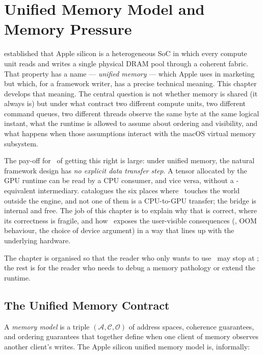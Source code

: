 \chapter{Unified Memory Model and Memory Pressure}
\label{ch:unified_memory}

 established that Apple silicon is a
heterogeneous SoC in which every compute unit reads and writes a
single physical DRAM pool through a coherent fabric. That property has
a name --- \emph{unified memory} --- which Apple uses in marketing but
which, for a framework writer, has a precise technical meaning. This
chapter develops that meaning. The central question is not whether
memory is shared (it always is) but under what contract two different
compute units, two different command queues, two different threads
observe the same byte at the same logical instant, what the runtime is
allowed to assume about ordering and visibility, and what happens when
those assumptions interact with the macOS virtual memory subsystem.

The pay-off for \Lucid\ of getting this right is large: under unified
memory, the natural framework design has \emph{no explicit data
transfer step}. A tensor allocated by the GPU runtime can be read by
a CPU consumer, and vice versa, without a -equivalent
intermediary.  catalogues the six places
where \Lucid\ touches the world outside the engine, and not one of
them is a CPU-to-GPU transfer; the bridge is internal and free. The
job of this chapter is to explain why that is correct, where its
correctness is fragile, and how \Lucid\ exposes the user-visible
consequences (, OOM behaviour, the choice of
device argument) in a way that lines up with the underlying
hardware.

The chapter is organised so that the reader who only wants to use
\Lucid\ may stop at ; the rest is for
the reader who needs to debug a memory pathology or extend the
runtime.

\section{The Unified Memory Contract}
\label{sec:unified_memory:contract}

A \emph{memory model} is a triple \((\mathcal{A}, \mathcal{C}, \mathcal{O})\)
of address spaces, coherence guarantees, and ordering guarantees that
together define when one client of memory observes another client's
writes. The Apple silicon unified memory model is, informally:

